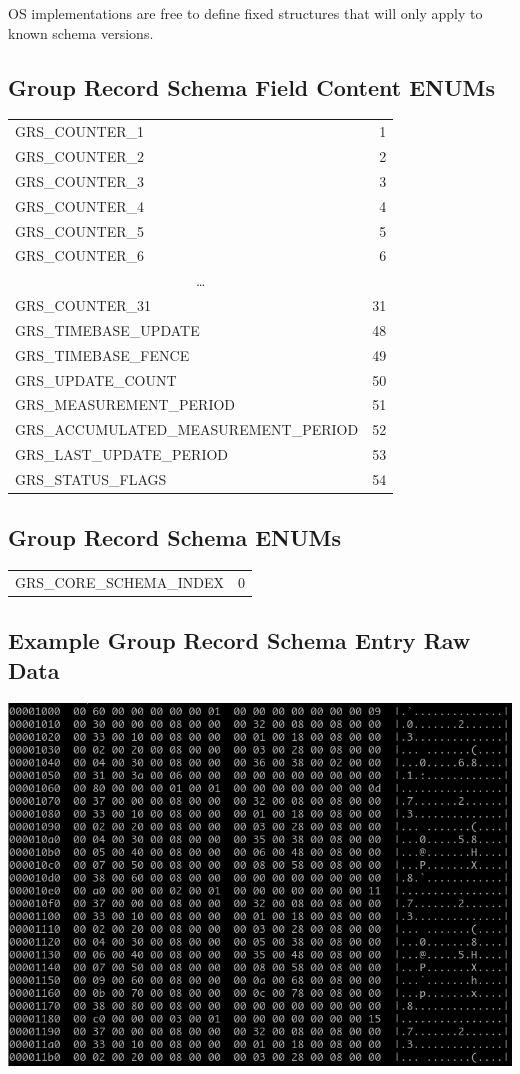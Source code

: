 \documentclass[14]{article}
\begin{document}
OS implementations are free to define fixed structures that will only apply to
known schema versions.

\subsection{Group Record Schema Field Content ENUMs}
\begin{tabular}[l]{lr}
  GRS\_COUNTER\_1 & 1 \\
  GRS\_COUNTER\_2 & 2 \\
  GRS\_COUNTER\_3 & 3 \\
  GRS\_COUNTER\_4 & 4 \\
  GRS\_COUNTER\_5 & 5 \\
  GRS\_COUNTER\_6 & 6 \\
  \multicolumn{2}{c}{\dots} \\
  GRS\_COUNTER\_31 & 31 \\
  GRS\_TIMEBASE\_UPDATE & 48 \\
  GRS\_TIMEBASE\_FENCE & 49 \\
  GRS\_UPDATE\_COUNT & 50 \\
  GRS\_MEASUREMENT\_PERIOD & 51 \\
  GRS\_ACCUMULATED\_MEASUREMENT\_PERIOD & 52 \\
  GRS\_LAST\_UPDATE\_PERIOD & 53 \\
  GRS\_STATUS\_FLAGS & 54 \\
\end{tabular}

\subsection{Group Record Schema ENUMs}
\begin{tabular}[l]{lr}
  GRS\_CORE\_SCHEMA\_INDEX & 0 \\
\end{tabular}

\subsection{Example Group Record Schema Entry Raw Data}
\includegraphics[scale=0.6]{group_schema_raw.png}
\end{document}
